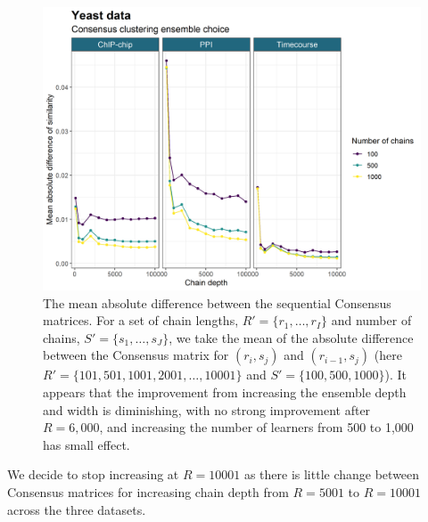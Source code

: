 \documentclass{bioinfo}
\begin{document}
\begin{figure}
	\centering
	\includegraphics[scale=0.5]{./SupplementaryMaterial/Images/Yeast/EnsembleChoicePlotAlt.png}
	\caption{The mean absolute difference between the sequential Consensus matrices. For a set of chain lengths, $R'=\{r_1, \ldots, r_I\}$ and number of chains, $S'=\{s_1, \ldots, s_J\}$, we take the mean of the absolute difference between the Consensus matrix for $(r_i, s_j)$ and $(r_{i-1}, s_{j})$ (here $R'=\{101, 501, 1001, 2001, \ldots, 10001\}$ and $S'=\{100, 500, 1000\}$). 
		It appears that the improvement from increasing the ensemble depth and width is diminishing, with no strong improvement after $R=6,000$, and increasing the number of learners from 500 to 1,000 has small effect.}
	\label{fig:ensembleChoice}
\end{figure}
We decide to stop increasing at $R=10001$ as there is little change between Consensus matrices for increasing chain depth from $R=5001$ to $R=10001$ across the three datasets.
\end{document}
